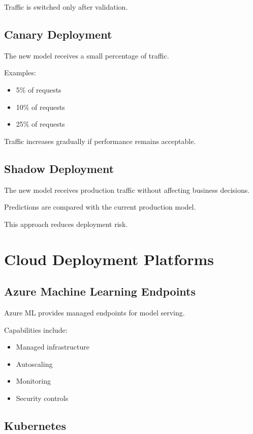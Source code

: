 Traffic is switched only after validation.

\subsection{Canary Deployment}

The new model receives a small percentage of traffic.

Examples:

\begin{itemize}
    \item 5\% of requests
    \item 10\% of requests
    \item 25\% of requests
\end{itemize}

Traffic increases gradually if performance remains acceptable.

\subsection{Shadow Deployment}

The new model receives production traffic without affecting business decisions.

Predictions are compared with the current production model.

This approach reduces deployment risk.

\section{Cloud Deployment Platforms}

\subsection{Azure Machine Learning Endpoints}

Azure ML provides managed endpoints for model serving.

Capabilities include:

\begin{itemize}
    \item Managed infrastructure
    \item Autoscaling
    \item Monitoring
    \item Security controls
\end{itemize}

\subsection{Kubernetes}

